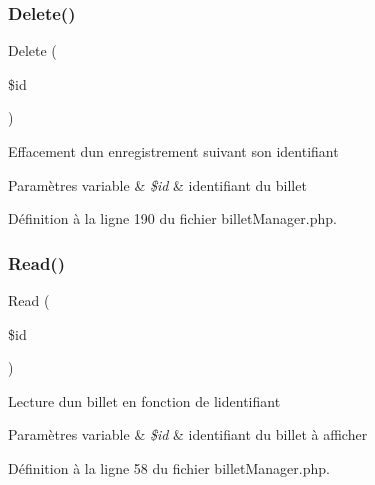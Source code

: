 \mbox{\label{class_src_1_1_managers_1_1billet_manager_a59113b5ecd1d155db6a4f30af34a1e80}} 
\subsubsection{\texorpdfstring{Delete()}{Delete()}}
{\footnotesize\ttfamily Delete (\begin{DoxyParamCaption}\item[{}]{\$id }\end{DoxyParamCaption})}

Effacement d\textquotesingle{}un enregistrement suivant son identifiant 
\begin{DoxyParams}[1]{Paramètres}
variable & {\em \$id} & identifiant du billet \\
\hline
\end{DoxyParams}


Définition à la ligne 190 du fichier billet\+Manager.\+php.

\mbox{\label{class_src_1_1_managers_1_1billet_manager_ad2bbc9b3130abdfe3a9fc9e9fe36716f}} 
\subsubsection{\texorpdfstring{Read()}{Read()}}
{\footnotesize\ttfamily Read (\begin{DoxyParamCaption}\item[{}]{\$id }\end{DoxyParamCaption})}

Lecture d\textquotesingle{}un billet en fonction de l\textquotesingle{}identifiant 
\begin{DoxyParams}[1]{Paramètres}
variable & {\em \$id} & identifiant du billet à afficher \\
\hline
\end{DoxyParams}


Définition à la ligne 58 du fichier billet\+Manager.\+php.

\mbox{\label{class_src_1_1_managers_1_1billet_manager_a24f9f6fa83eb8694eab0a87b2e6ad0b1}} 
